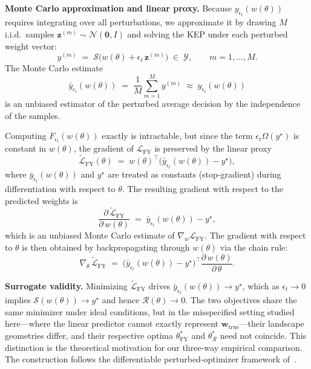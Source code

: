 \documentclass{article}
\begin{document}
\medskip
\noindent\textbf{Monte Carlo approximation and linear proxy.}
Because \(y_{\epsilon_t}(w(\theta))\) requires integrating over all
perturbations, we approximate it by drawing \(M\) i.i.d.\ samples
\(\mathbf{z}^{(m)}\sim\mathcal{N}(\mathbf{0},I)\) and solving the KEP under
each perturbed weight vector:
\[
  y^{(m)}
  \;=\;
  \mathcal{S}\!\bigl(w(\theta)+\epsilon_t\,\mathbf{z}^{(m)}\bigr)
  \;\in\;\mathcal{Y},
  \qquad m=1,\dots,M.
\]
The Monte Carlo estimate
\[
  \bar{y}_{\epsilon_t}(w(\theta))
  \;=\;
  \frac{1}{M}\sum_{m=1}^{M} y^{(m)}
  \;\approx\;
  y_{\epsilon_t}(w(\theta))
\]
is an unbiased estimator of the perturbed average decision by the
independence of the samples.

Computing \(F_{\epsilon_t}(w(\theta))\) exactly is intractable, but since the
term \(\epsilon_t\Omega(y^{\star})\) is constant in \(w(\theta)\), the
gradient of \(\mathcal{L}_{\mathrm{FY}}\) is preserved by the linear proxy
\[
  \widetilde{\mathcal{L}}_{\mathrm{FY}}(\theta)
  \;=\;
  w(\theta)^{\!\top}
  \bigl(\bar{y}_{\epsilon_t}(w(\theta)) - y^{\star}\bigr),
\]
where \(\bar{y}_{\epsilon_t}(w(\theta))\) and \(y^{\star}\) are treated as
constants (stop-gradient) during differentiation with respect to \(\theta\).
The resulting gradient with respect to the predicted weights is
\[
  \frac{\partial\,\widetilde{\mathcal{L}}_{\mathrm{FY}}}{\partial\,w(\theta)}
  \;=\;
  \bar{y}_{\epsilon_t}(w(\theta)) - y^{\star},
\]
which is an unbiased Monte Carlo estimate of
\(\nabla_{w}\mathcal{L}_{\mathrm{FY}}\).  The gradient with respect to
\(\theta\) is then obtained by backpropagating through \(w(\theta)\) via the
chain rule:
\[
  \nabla_{\theta}\,\widetilde{\mathcal{L}}_{\mathrm{FY}}
  \;=\;
  \bigl(\bar{y}_{\epsilon_t}(w(\theta))-y^{\star}\bigr)^{\!\top}
  \frac{\partial\,w(\theta)}{\partial\,\theta}.
\]

\medskip
\noindent\textbf{Surrogate validity.}
Minimizing \(\widetilde{\mathcal{L}}_{\mathrm{FY}}\) drives
\(\bar{y}_{\epsilon_t}(w(\theta))\to y^{\star}\), which as \(\epsilon_t\to 0\)
implies \(\mathcal{S}(w(\theta))\to y^{\star}\) and hence
\(\mathcal{R}(\theta)\to 0\).  The two objectives share the same minimizer
under ideal conditions, but in the misspecified setting studied here—where the
linear predictor cannot exactly represent \(\mathbf w_{\mathrm{true}}\)—their
landscape geometries differ, and their respective optima
\(\theta^{*}_{\mathrm{FY}}\) and \(\theta^{*}_{\mathcal{R}}\) need not
coincide.  This distinction is the theoretical motivation for our three-way
empirical comparison.  The construction follows the differentiable
perturbed-optimizer framework of~\citet{berthet2020learning}.
\end{document}
